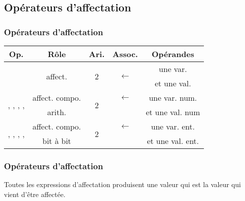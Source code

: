 \subsection{Opérateurs d'affectation}

\begin{frame}[fragile]
\frametitle{Opérateurs d'affectation}

\begin{center}
    \begin{tabular}{c|c|c|c|c}
        {\bf Op.} & {\bf Rôle} & {\bf Ari.} & {\bf Assoc.}
            & {\bf Opérandes} \\ \hline \hline
        \multirow{2}{*}{\Code{=}} & \multirow{2}{*}{affect.}
            & \multirow{2}{*}{2} & \multirow{2}{*}{$\longleftarrow$}
            & une var. \\
        & & & & et une val. \\ \hline
        \multirow{2}{*}{\Code{+=}, \Code{-=}, \Code{*=}, \Code{/=}, \Code{\%=}}
            & affect. compo.
            & \multirow{2}{*}{2} & $\longleftarrow$ & une var. num. \\
        & arith. & & & et une val. num \\ \hline
        \multirow{2}{*}{\Code{\&=}, \Code{|=}, \Code{\textasciicircum=},
        \Code{<\,<=}, \Code{>\,>=}}
        & affect. compo.
            & \multirow{2}{*}{2} & $\longleftarrow$ & une var. ent. \\
        & bit à bit & & & et une val. ent.
    \end{tabular}
\end{center}
\medskip

\end{frame}

\begin{frame}[fragile]
\frametitle{Opérateurs d'affectation}
Toutes les expressions d'affectation produisent une valeur qui est
la valeur qui vient d'être affectée.
\medskip

\begin{semiverbatim}\small{}
\end{semiverbatim}
\end{frame}

